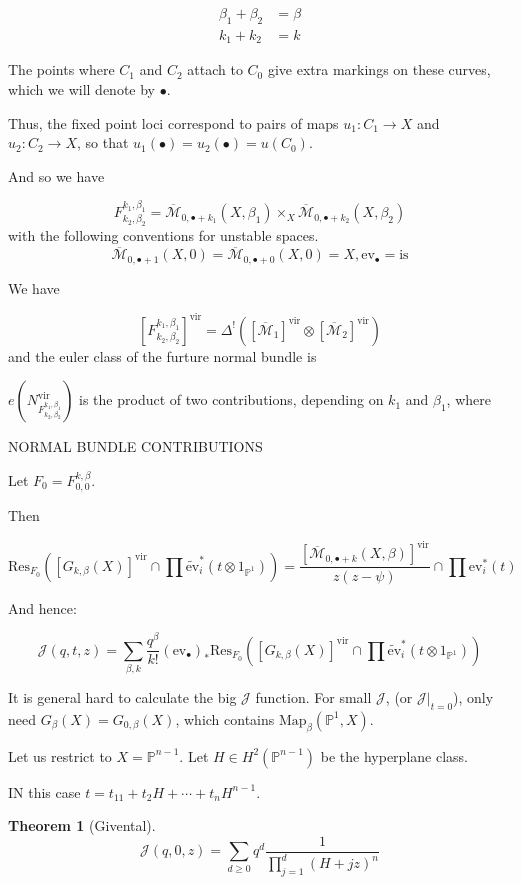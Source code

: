\documentclass{amsart}
\theoremstyle{definition}
\newtheorem{theorem}[dummy]{Theorem}
\newcommand{\proj}{\mathbb{P}}
\newcommand{\J}{\mathcal{J}}
\newcommand{\Mbar}{\overline{\mathcal{M}}}
\newcommand{\one}{1}
\newcommand{\ev}{\text{ev}}
\newcommand{\vir}{\text{vir}}
\begin{document}
\begin{align*}
\beta_1+\beta_2&=\beta \\
k_1+k_2&=k
\end{align*}

The points where $C_1$ and $C_2$ attach to $C_0$ give extra markings on these curves, which we will denote by $\bullet$.  

Thus, the fixed point loci correspond to pairs of maps $u_1:C_1\to X$ and $u_2:C_2\to X$, so that $u_1(\bullet)=u_2(\bullet)=u(C_0)$.

And so we have 

$$F^{k_1,\beta_1}_{k_2,\beta_2}=\Mbar_{0,\bullet+k_1}(X,\beta_1)\times_X \Mbar_{0,\bullet+k_2}(X,\beta_2)$$
with the following conventions for unstable spaces.
$$\Mbar_{0,\bullet+1}(X,0)=\Mbar_{0,\bullet+0}(X,0)=X, \ev_\bullet=\text{is}$$

We have

$$[F^{k_1,\beta_1}_{k_2,\beta_2}]^\vir=\Delta^!\left([\Mbar_1]^\vir\otimes[\Mbar_2]^\vir\right)$$
and the euler class of the furture normal bundle is

$e(N^\vir_{F^{k_1,\beta_1}_{k_2,\beta_2}})$ 
is the product of two contributions, depending on $k_1$ and $\beta_1$, where

NORMAL BUNDLE CONTRIBUTIONS


Let $F_0=F^{k,\beta}_{0,0}$.  

Then

$$\text{Res}_{F_0} \left([G_{k,\beta}(X)]^\vir\cap \prod \tilde{\ev}^*_i(t\otimes\one_{\proj^1})\right)
=\frac{[\Mbar_{0, \bullet+k} (X,\beta)]^\vir}{z(z-\psi)}\cap\prod \ev^*_i(t)$$


And hence:

$$\J(q,t,z)=\sum_{\beta,k} \frac{q^\beta}{k!}(\ev_\bullet)_*\text{Res}_{F_0}\left([G_{k,\beta}(X)]^\vir\cap \prod \tilde{\ev}^*_i(t\otimes\one_{\proj^1})\right)$$


It is general hard to calculate the big $\J$ function.  For small $\J$, (or $\J|_{t=0}$), only need $G_\beta(X)=G_{0,\beta}(X)$, which contains $\text{Map}_\beta(\proj^1,X)$.

Let us restrict to $X=\proj^{n-1}$.  Let $H\in H^2(\proj^{n-1})$ be the hyperplane class.

IN this case $t=t_1\one+t_2H+\cdots+t_nH^{n-1}$.

\begin{theorem}[Givental]
$$\J(q,0,z)=\sum_{d\geq 0} q^d \frac{1}{\prod_{j=1}^d(H+jz)^n}$$
\end{theorem}
\end{document}
